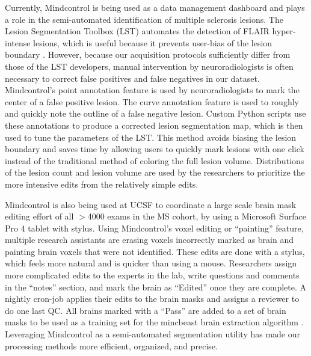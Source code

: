 Currently, Mindcontrol is being used as a data management dashboard and plays a role in the semi-automated identification of multiple sclerosis lesions. The Lesion Segmentation Toolbox (LST) automates the detection of FLAIR hyper-intense lesions, which is useful because it prevents user-bias of the lesion boundary \cite{Schmidt_2012}. However, because our acquisition protocols sufficiently differ from those of the LST developers, manual intervention by neuroradiologists is often necessary to correct false positives and false negatives in our dataset. Mindcontrol's point annotation feature is used by neuroradiologists to mark the center of a false positive lesion. The curve annotation feature is used to roughly and quickly note the outline of a false negative lesion. Custom Python scripts use these annotations to produce a corrected lesion segmentation map, which is then used to tune the parameters of the LST. This method avoids biasing the lesion boundary and saves time by allowing users to quickly mark lesions with one click instead of the traditional method of coloring the full lesion volume. Distributions of the lesion count and lesion volume are used by the researchers to prioritize the more intensive edits from the relatively simple edits.

Mindcontrol is also being used at UCSF to coordinate a large scale brain mask editing effort of all $>$4000 exams in the MS cohort, by using a Microsoft Surface Pro 4 tablet with stylus. Using Mindcontrol's voxel editing or ``painting'' feature, multiple research assistants are erasing voxels incorrectly marked as brain and painting brain voxels that were not identified.  These edits are done with a stylus, which feels more natural and is quicker than using a mouse. Researchers assign more complicated edits to the experts in the lab, write questions and comments in the ``notes'' section, and mark the brain as ``Edited'' once they are complete. A nightly cron-job applies their edits to the brain masks and assigns a reviewer to do one last QC. All brains marked with a ``Pass'' are added to a set of brain masks to be  used as a training set for the mincbeast brain extraction algorithm \cite{eskildsen2012beast}. Leveraging Mindcontrol as a semi-automated segmentation utility has made our processing methods more efficient, organized, and precise.






